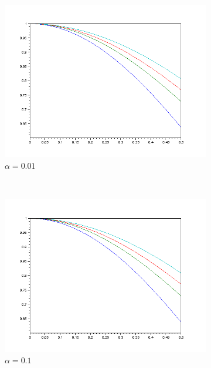 \documentclass{article}
\begin{document}
\begin{figure}
        \begin{subfigure}[b]{0.3\textwidth}
								\includegraphics[scale=0.3]{img/graphe2-a.png}
                \caption{$\alpha = 0.01$}
        \end{subfigure}%
        ~
        \begin{subfigure}[b]{0.3\textwidth}
								\includegraphics[scale=0.3]{img/graphe2-b.png}
                \caption{$\alpha = 0.1$}
        \end{subfigure}
				~
        \begin{subfigure}[b]{0.3\textwidth}

\end{subfigure}
\end{figure}
\end{document}
